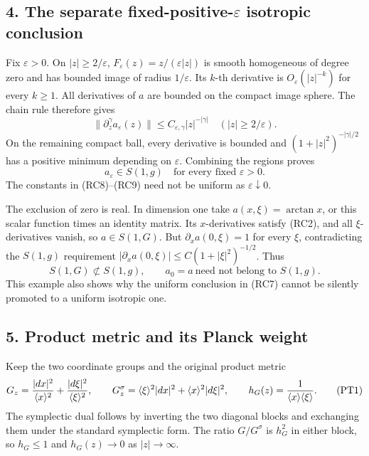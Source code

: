 \documentclass[
  11pt,
]{article}
\begin{document}
\subsection{\texorpdfstring{4. The separate
fixed-positive-\(\varepsilon\) isotropic
conclusion}{4. The separate fixed-positive-\textbackslash varepsilon isotropic conclusion}}\label{the-separate-fixed-positive-varepsilon-isotropic-conclusion}

Fix \(\varepsilon>0\). On \(|z|\ge2/\varepsilon\),
\(F_\varepsilon(z)=z/(\varepsilon|z|)\) is smooth homogeneous of degree
zero and has bounded image of radius \(1/\varepsilon\). Its \(k\)-th
derivative is \(O_\varepsilon(|z|^{-k})\) for every \(k\ge1\). All
derivatives of \(a\) are bounded on the compact image sphere. The chain
rule therefore gives \[
 \|\partial_z^\gamma a_\varepsilon(z)\|
       \le C_{\varepsilon,\gamma}|z|^{-|\gamma|}
       \quad (|z|\ge2/\varepsilon).
 \tag{RC8}
\] On the remaining compact ball, every derivative is bounded and
\((1+|z|^2)^{-|\gamma|/2}\) has a positive minimum depending on
\(\varepsilon\). Combining the regions proves \[
 a_\varepsilon\in S(1,g)
       \quad\text{for every fixed }\varepsilon>0 .
 \tag{RC9}
\] The constants in (RC8)--(RC9) need not be uniform as
\(\varepsilon\downarrow0\).

The exclusion of zero is real. In dimension one take
\(a(x,\xi)=\arctan x\), or this scalar function times an identity
matrix. Its \(x\)-derivatives satisfy (RC2), and all \(\xi\)-derivatives
vanish, so \(a\in S(1,G)\). But \(\partial_xa(0,\xi)=1\) for every
\(\xi\), contradicting the \(S(1,g)\) requirement
\(|\partial_xa(0,\xi)|\le C(1+|\xi|^2)^{-1/2}\). Thus \[
 S(1,G)\not\subset S(1,g),\qquad
 a_0=a\ \text{need not belong to }S(1,g).
 \tag{RC10}
\] This example also shows why the uniform conclusion in (RC7) cannot be
silently promoted to a uniform isotropic one.

\subsection{5. Product metric and its Planck
weight}\label{product-metric-and-its-planck-weight}

Keep the two coordinate groups and the original product metric \[
 G_z={|dx|^2\over\langle x\rangle^2}
             +{|d\xi|^2\over\langle\xi\rangle^2},
 \qquad
 G_z^\sigma
   =\langle\xi\rangle^2|dx|^2
       +\langle x\rangle^2|d\xi|^2,
 \qquad
 h_G(z)={1\over\langle x\rangle\langle\xi\rangle}.
 \tag{PT1}
\] The symplectic dual follows by inverting the two diagonal blocks and
exchanging them under the standard symplectic form. The ratio
\(G/G^\sigma\) is \(h_G^2\) in either block, so \(h_G\le1\) and
\(h_G(z)\to0\) as \(|z|\to\infty\).
\end{document}
